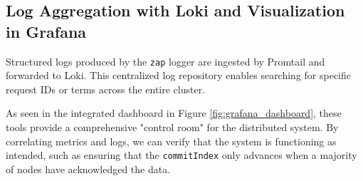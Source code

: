 \subsection{Log Aggregation with Loki and Visualization in Grafana}
Structured logs produced by the \texttt{zap} logger are ingested by Promtail and forwarded to Loki. This centralized log repository enables searching for specific request IDs or terms across the entire cluster.



As seen in the integrated dashboard in Figure \ref{fig:grafana_dashboard}, these tools provide a comprehensive "control room" for the distributed system. By correlating metrics and logs, we can verify that the system is functioning as intended, such as ensuring that the \texttt{commitIndex} only advances when a majority of nodes have acknowledged the data.